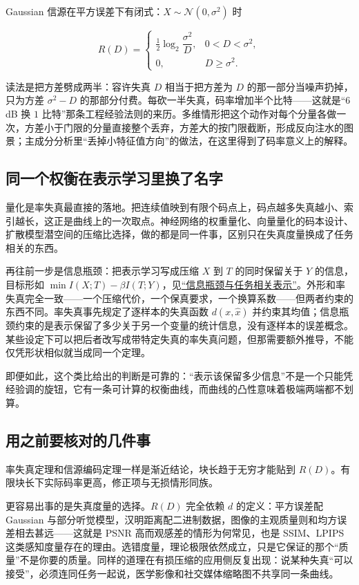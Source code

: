 Gaussian 信源在平方误差下有闭式：\(X\sim\mathcal N(0,\sigma^2)\) 时

\[
R(D)=\begin{cases}
\tfrac12\log_2\dfrac{\sigma^2}{D},&0<D<\sigma^2,\\[2pt]
0,&D\ge\sigma^2.
\end{cases}
\]

读法是把方差劈成两半：容许失真 \(D\) 相当于把方差为 \(D\) 的那一部分当噪声扔掉，只为方差 \(\sigma^2-D\) 的那部分付费。每砍一半失真，码率增加半个比特——这就是``\(6\) dB 换 \(1\) 比特''那条工程经验法则的来历。多维情形把这个动作对每个分量各做一次，方差小于门限的分量直接整个丢弃，方差大的按门限截断，形成反向注水的图景；主成分分析里``丢掉小特征值方向''的做法，在这里得到了码率意义上的解释。

\subsection{同一个权衡在表示学习里换了名字}

量化是率失真最直接的落地。把连续值映到有限个码点上，码点越多失真越小、索引越长，这正是曲线上的一次取点。神经网络的权重量化、向量量化的码本设计、扩散模型潜空间的压缩比选择，做的都是同一件事，区别只在失真度量换成了任务相关的东西。

再往前一步是信息瓶颈：把表示学习写成压缩 \(X\) 到 \(T\) 的同时保留关于 \(Y\) 的信息，目标形如 \(\min I(X;T)-\beta I(T;Y)\)，见\hyperref[sec:07-Information-Theory/06-Information-and-Learning/03]{``信息瓶颈与任务相关表示''}。外形和率失真完全一致——一个压缩代价，一个保真要求，一个换算系数——但两者约束的东西不同。率失真事先规定了逐样本的失真函数 \(d(x,\hat x)\) 并约束其均值；信息瓶颈约束的是表示保留了多少关于另一个变量的统计信息，没有逐样本的误差概念。某些设定下可以把后者改写成带特定失真的率失真问题，但那需要额外推导，不能仅凭形状相似就当成同一个定理。

即便如此，这个类比给出的判断是可靠的：``表示该保留多少信息''不是一个只能凭经验调的旋钮，它有一条可计算的权衡曲线，而曲线的凸性意味着极端两端都不划算。

\subsection{用之前要核对的几件事}

率失真定理和信源编码定理一样是渐近结论，块长趋于无穷才能贴到 \(R(D)\)。有限块长下实际码率更高，修正项与无损情形同族。

更容易出事的是失真度量的选择。\(R(D)\) 完全依赖 \(d\) 的定义：平方误差配 Gaussian 与部分听觉模型，汉明距离配二进制数据，图像的主观质量则和均方误差相去甚远——这就是 PSNR 高而观感差的情形为何常见，也是 SSIM、LPIPS 这类感知度量存在的理由。选错度量，理论极限依然成立，只是它保证的那个``质量''不是你要的质量。同样的道理在有损压缩的应用侧反复出现：说某种失真``可以接受''，必须连同任务一起说，医学影像和社交媒体缩略图不共享同一条曲线。

